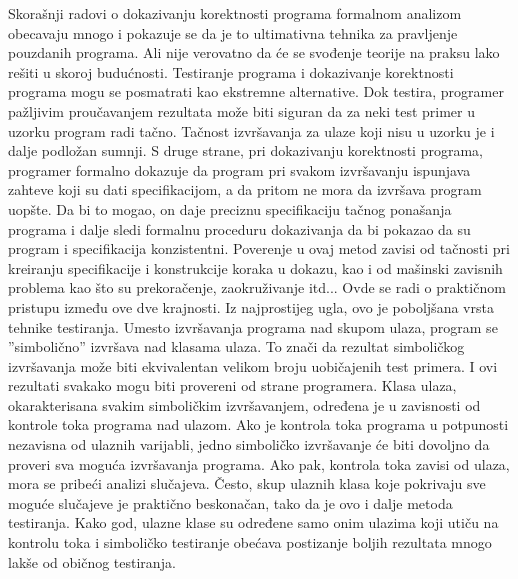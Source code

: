 \documentclass[a4paper]{article}
\begin{document}
{Skorašnji radovi o dokazivanju korektnosti programa formalnom analizom obecavaju mnogo i pokazuje se da je to ultimativna tehnika za pravljenje pouzdanih programa. Ali nije verovatno da će se svođenje teorije na praksu lako rešiti u skoroj budućnosti. Testiranje programa i dokazivanje korektnosti programa mogu se posmatrati kao ekstremne alternative. Dok testira, programer pažljivim proučavanjem rezultata može biti siguran da za neki test primer u uzorku program radi tačno. Tačnost izvršavanja za ulaze koji nisu u uzorku je i dalje podložan sumnji. S druge strane, pri dokazivanju korektnosti programa, programer formalno dokazuje da program pri svakom izvršavanju ispunjava zahteve koji su dati specifikacijom, a da pritom ne mora da izvršava program uopšte. Da bi to mogao, on daje preciznu specifikaciju tačnog ponašanja programa i dalje sledi formalnu proceduru dokazivanja da bi pokazao da su program i specifikacija konzistentni. Poverenje u ovaj metod zavisi od tačnosti pri kreiranju specifikacije i konstrukcije koraka u dokazu, kao i od mašinski zavisnih problema kao što su prekoračenje, zaokruživanje itd...  Ovde se radi o praktičnom pristupu između ove dve krajnosti. Iz najprostijeg ugla, ovo je poboljšana vrsta tehnike testiranja. Umesto izvršavanja programa nad skupom ulaza, program se ''simbolično'' izvršava nad klasama ulaza. To znači da rezultat simboličkog izvršavanja može biti ekvivalentan velikom broju uobičajenih test primera. I ovi rezultati svakako mogu biti provereni od strane programera. Klasa ulaza, okarakterisana svakim simboličkim izvršavanjem, određena je u zavisnosti od kontrole toka programa nad ulazom. Ako je kontrola toka programa u potpunosti nezavisna od ulaznih varijabli, jedno simboličko izvršavanje će biti dovoljno da proveri sva moguća izvršavanja programa. Ako pak, kontrola toka zavisi od ulaza, mora se pribeći analizi slučajeva. Često, skup ulaznih klasa koje pokrivaju sve moguće slučajeve je praktično beskonačan, tako da je ovo i dalje metoda testiranja. Kako god, ulazne klase su određene samo onim ulazima koji utiču na kontrolu toka i simboličko testiranje obećava postizanje boljih rezultata mnogo lakše od običnog testiranja.  


}
\end{document}
